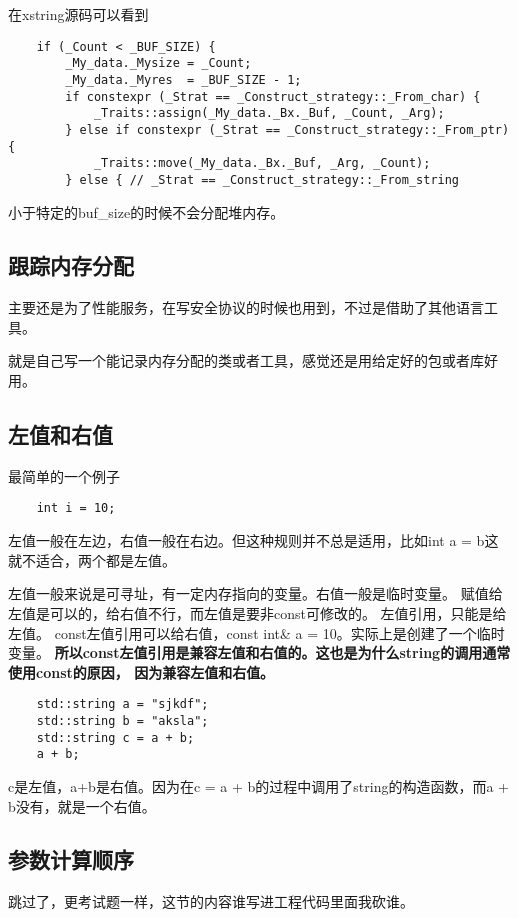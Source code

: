 \documentclass{article}
\begin{document}
\begin{sloppypar}
在xstring源码可以看到
\begin{lstlisting}
	if (_Count < _BUF_SIZE) {
		_My_data._Mysize = _Count;
		_My_data._Myres  = _BUF_SIZE - 1;
		if constexpr (_Strat == _Construct_strategy::_From_char) {
			_Traits::assign(_My_data._Bx._Buf, _Count, _Arg);
		} else if constexpr (_Strat == _Construct_strategy::_From_ptr) {
			_Traits::move(_My_data._Bx._Buf, _Arg, _Count);
		} else { // _Strat == _Construct_strategy::_From_string
\end{lstlisting}
小于特定的buf\_size的时候不会分配堆内存。

\subsection{跟踪内存分配}
主要还是为了性能服务，在写安全协议的时候也用到，不过是借助了其他语言工具。

就是自己写一个能记录内存分配的类或者工具，感觉还是用给定好的包或者库好用。

\subsection{左值和右值}
最简单的一个例子
\begin{lstlisting}
	int i = 10;
\end{lstlisting}
左值一般在左边，右值一般在右边。但这种规则并不总是适用，比如int a = b这就不适合，两个都是左值。

\begin{outline}
	\1 左值一般来说是可寻址，有一定内存指向的变量。右值一般是临时变量。
	\1 赋值给左值是可以的，给右值不行，而左值是要非const可修改的。
	\1 左值引用，只能是给左值。
	\1 const左值引用可以给右值，const int\& a = 10。实际上是创建了一个临时变量。
	\textbf{所以const左值引用是兼容左值和右值的。这也是为什么string的调用通常使用const的原因，
	因为兼容左值和右值。}
\end{outline}

\begin{lstlisting}
	std::string a = "sjkdf";
    std::string b = "aksla";
    std::string c = a + b;
    a + b;
\end{lstlisting}
c是左值，a+b是右值。因为在c = a + b的过程中调用了string的构造函数，而a + b没有，就是一个右值。

\subsection{参数计算顺序}
跳过了，更考试题一样，这节的内容谁写进工程代码里面我砍谁。


\end{sloppypar}
\end{document}
